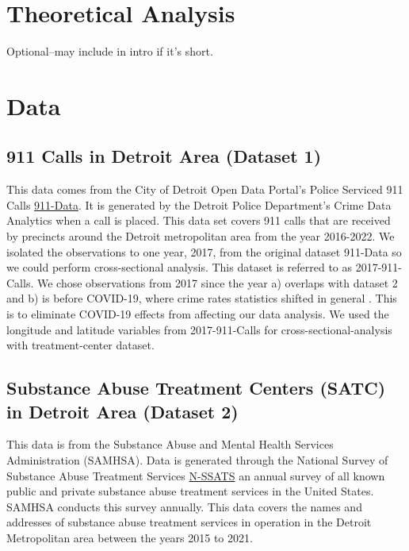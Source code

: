 \documentclass[12pt]{article}
\begin{document}
\section{Theoretical Analysis}
\label{sec:theory}
Optional--may include in intro if it's short.


\section{Data}
\label{sec:data}

\subsection{911 Calls in Detroit Area (Dataset 1)}

This data comes from the City of Detroit Open Data Portal's Police Serviced 911 Calls  \href{https://data.detroitmi.gov/datasets/detroitmi::police-serviced-911-calls/about}{911-Data}. It is generated by the Detroit Police Department's Crime Data Analytics when a call is placed. This data set covers 911 calls that are received by precincts around the Detroit metropolitan area from the year 2016-2022. We isolated the observations to one year, 2017, from the original dataset 911-Data so we could perform cross-sectional analysis. This dataset is referred to as 2017-911-Calls. We chose observations from 2017 since the year a) overlaps with dataset 2 and b) is before COVID-19, where crime rates statistics shifted in general \cite{covid_and_crime}. This is to eliminate COVID-19 effects from affecting our data analysis. We used the longitude and latitude variables from 2017-911-Calls for cross-sectional-analysis with treatment-center dataset.

\subsection{Substance Abuse Treatment Centers (SATC) in Detroit Area (Dataset 2)}

This data is from the Substance Abuse and Mental Health Services Administration (SAMHSA). Data is generated through the National Survey of Substance Abuse Treatment Services \href{https://www.samhsa.gov/data/data-we-collect/n-ssats-national-survey-substance-abuse-treatment-services}{N-SSATS} an annual survey of all known public and private substance abuse treatment services in the United States. SAMHSA conducts this survey annually. This data covers the names and addresses of substance abuse treatment services in operation in the Detroit Metropolitan area between the years 2015 to 2021. 
\end{document}
